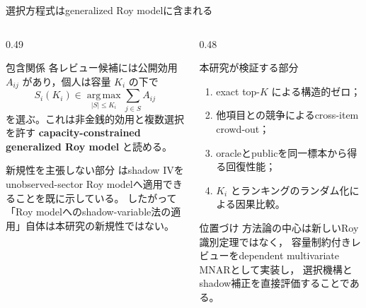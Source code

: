 \documentclass[aspectratio=169,10pt]{beamer}
\newcommand{\1}{\mathbf{1}}
\newcommand{\argmax}{\operatorname*{arg\,max}}
\begin{document}
\begin{frame}{選択方程式はgeneralized Roy modelに含まれる}
\begin{columns}[T,onlytextwidth]
\begin{column}{0.49\textwidth}
\begin{block}{包含関係}
\scriptsize
各レビュー候補には公開効用 $A_{ij}$ があり，個人は容量 $K_i$ の下で
\[
S_i(K_i)\in\argmax_{|S|\le K_i}\sum_{j\in S}A_{ij}
\]
を選ぶ。これは非金銭的効用と複数選択を許す
\textbf{capacity-constrained generalized Roy model} と読める。
\end{block}
\begin{alertblock}{新規性を主張しない部分}
\scriptsize
\textcite{dHaultfoeuille2010} はshadow IVを
unobserved-sector Roy modelへ適用できることを既に示している。
したがって「Roy modelへのshadow-variable法の適用」自体は本研究の新規性ではない。
\end{alertblock}
\end{column}
\begin{column}{0.48\textwidth}
\begin{block}{本研究が検証する部分}
\scriptsize
\begin{enumerate}
\item exact top-$K$ による構造的ゼロ；
\item 他項目との競争によるcross-item crowd-out；
\item oracleとpublicを同一標本から得る回復性能；
\item $K_i$ とランキングのランダム化による因果比較。
\end{enumerate}
\end{block}
\begin{alertblock}{位置づけ}
\scriptsize
方法論の中心は新しいRoy識別定理ではなく，
容量制約付きレビューをdependent multivariate MNARとして実装し，
選択機構とshadow補正を直接評価することである。
\end{alertblock}
\end{column}
\end{columns}
\end{frame}
\end{document}
